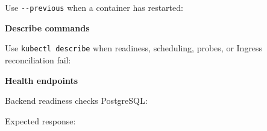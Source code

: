 Use \texttt{-\/\allowbreak{}-previous} when a container has restarted:

\begin{Shaded}
\begin{Highlighting}[]
 \OperatorTok{=}
\end{Highlighting}
\end{Shaded}

\vspace{0.5em}\noindent\textbf{Describe commands}\par

Use \texttt{kubectl\ describe} when readiness, scheduling, probes, or
Ingress reconciliation fail:

\begin{Shaded}
\begin{Highlighting}[]
\end{Highlighting}
\end{Shaded}

\vspace{0.5em}\noindent\textbf{Health endpoints}\par

Backend readiness checks PostgreSQL:

\begin{Shaded}
\begin{Highlighting}[]
 
\end{Highlighting}
\end{Shaded}

Expected response:

\begin{Shaded}
\begin{Highlighting}[]
\FunctionTok{\{}\FunctionTok{:}\FunctionTok{,}\FunctionTok{:}\FunctionTok{,}\FunctionTok{:\{}\FunctionTok{:}\FunctionTok{\}\}}
\end{Highlighting}
\end{Shaded}

